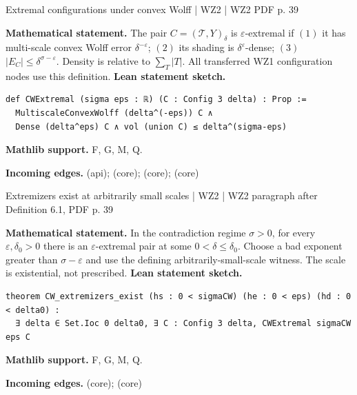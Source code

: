 \documentclass[10pt,a4paper]{article}
\newcommand{\nodecard}[1]{\hyperlink{node-#1}{\texttt{\detokenize{#1}}}}
\begin{document}
\begin{minipage}{\linewidth}
\hypertarget{node-W2D6_1}{}
\begin{tcolorbox}[colback=white,colframe=setupfg,colbacktitle=setupbg,coltitle=ink,boxrule=0.45pt,arc=1.6mm,left=3mm,right=3mm,top=2mm,bottom=2mm,title={\sffamily\bfseries WZ2 Definition 6.1 \hfill \texttt{W2D6\_1}}]
{\sffamily\small\color{muted}Extremal configurations under convex Wolff | WZ2 | WZ2 PDF p. 39}\par
\textbf{Mathematical statement.} The pair $C=(\mathcal T,Y)_\delta$ is $\varepsilon$-extremal if
$(1)$ it has multi-scale convex Wolff error $\delta^{-\varepsilon}$;
$(2)$ its shading is $\delta^\varepsilon$-dense;
$(3)$ $|E_C|\le\delta^{\sigma-\varepsilon}$.
Density is relative to $\sum_T|T|$. All transferred WZ1 configuration nodes use this definition.
\smallskip\textbf{Lean statement sketch.}
\begin{Verbatim}[fontsize=\small,breaklines=true,breakanywhere=true,tabsize=2]
def CWExtremal (sigma eps : ℝ) (C : Config 3 delta) : Prop :=
  MultiscaleConvexWolff (delta^(-eps)) C ∧
  Dense (delta^eps) C ∧ vol (union C) ≤ delta^(sigma-eps)
\end{Verbatim}
{\footnotesize\textbf{Mathlib support.} F, G, M, Q.\par
\textbf{Incoming edges.} \nodecard{W2Sigma} (api); \nodecard{W2MW} (core); \nodecard{Imass} (core); \nodecard{W2Sigma} (core)\par}

\end{tcolorbox}\end{minipage}\par\medskip
\begin{minipage}{\linewidth}
\hypertarget{node-W2Exists}{}
\begin{tcolorbox}[colback=white,colframe=setupfg,colbacktitle=setupbg,coltitle=ink,boxrule=0.45pt,arc=1.6mm,left=3mm,right=3mm,top=2mm,bottom=2mm,title={\sffamily\bfseries WZ2 Section 6.2 / WZ1 Lem. 3.1 \hfill \texttt{W2Exists}}]
{\sffamily\small\color{muted}Extremizers exist at arbitrarily small scales | WZ2 | WZ2 paragraph after Definition 6.1, PDF p. 39}\par
\textbf{Mathematical statement.} In the contradiction regime $\sigma>0$, for every $\varepsilon,\delta_0>0$ there is an $\varepsilon$-extremal pair at some $0<\delta\le\delta_0$.
Choose a bad exponent greater than $\sigma-\varepsilon$ and use the defining arbitrarily-small-scale witness.
The scale is existential, not prescribed.
\smallskip\textbf{Lean statement sketch.}
\begin{Verbatim}[fontsize=\small,breaklines=true,breakanywhere=true,tabsize=2]
theorem CW_extremizers_exist (hs : 0 < sigmaCW) (he : 0 < eps) (hd : 0 < delta0) :
  ∃ delta ∈ Set.Ioc 0 delta0, ∃ C : Config 3 delta, CWExtremal sigmaCW eps C
\end{Verbatim}
{\footnotesize\textbf{Mathlib support.} F, G, M, Q.\par
\textbf{Incoming edges.} \nodecard{W2Sigma} (core); \nodecard{W2D6_1} (core)\par}

\end{tcolorbox}\end{minipage}\par\medskip
\end{document}
